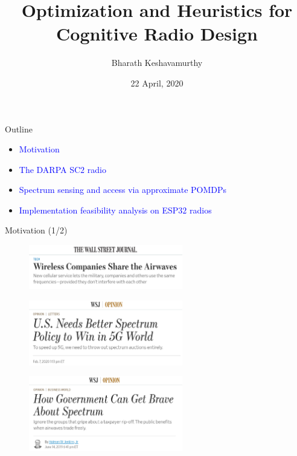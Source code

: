 \documentclass{beamer}
\title[M.S. Dissertation]{Optimization and Heuristics for Cognitive Radio Design}
\author{Bharath Keshavamurthy}
\institute{School of Electrical and Computer Engineering, Purdue University}
\date{22 April, 2020}
\begin{document}
\begin{frame}
  \titlepage
\end{frame}
\begin{frame}{Outline}
  \tableofcontents
  \begin{itemize}
      \item \textcolor{blue}{Motivation}
      \item \textcolor{blue}{The DARPA SC$2$ radio}
      \item \textcolor{blue}{Spectrum sensing and access via approximate POMDPs}
      \item \textcolor{blue}{Implementation feasibility analysis on ESP$32$ radios}
  \end{itemize}
\end{frame}
\begin{frame}{Motivation (1/2)}
\begin{figure}
    \centering
    \includegraphics[width = 0.6\textwidth]{WSJ_1.PNG}
    \label{fig:1}
\end{figure}
\begin{figure}
    \centering
    \includegraphics[width = 0.6\textwidth]{WSJ_2.PNG}
    \label{fig:1}
\end{figure}
\begin{figure}
    \centering
    \includegraphics[width = 0.6\textwidth]{WSJ_3.PNG}
    \label{fig:1}
\end{figure}
\end{frame}
\end{document}
